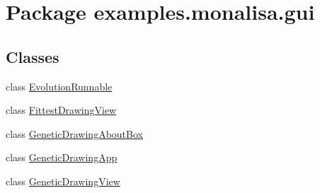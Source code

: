\hypertarget{namespaceexamples_1_1monalisa_1_1gui}{\section{Package examples.\-monalisa.\-gui}
\label{namespaceexamples_1_1monalisa_1_1gui}
}
\subsection*{Classes}
\begin{DoxyCompactItemize}
\item 
class \hyperlink{classexamples_1_1monalisa_1_1gui_1_1_evolution_runnable}{Evolution\-Runnable}
\item 
class \hyperlink{classexamples_1_1monalisa_1_1gui_1_1_fittest_drawing_view}{Fittest\-Drawing\-View}
\item 
class \hyperlink{classexamples_1_1monalisa_1_1gui_1_1_genetic_drawing_about_box}{Genetic\-Drawing\-About\-Box}
\item 
class \hyperlink{classexamples_1_1monalisa_1_1gui_1_1_genetic_drawing_app}{Genetic\-Drawing\-App}
\item 
class \hyperlink{classexamples_1_1monalisa_1_1gui_1_1_genetic_drawing_view}{Genetic\-Drawing\-View}
\end{DoxyCompactItemize}

